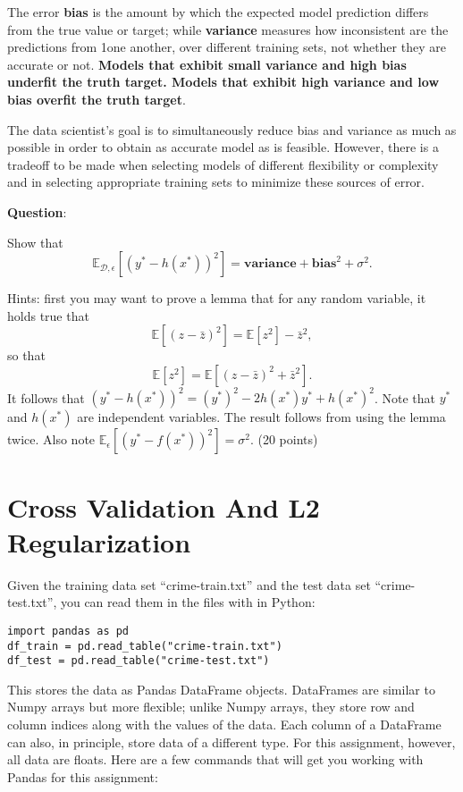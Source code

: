 \documentclass{article}
\begin{document}
The error \textbf{bias} is the amount by which the expected model prediction differs from the true value or target; while \textbf{variance} measures how inconsistent are the predictions from 1one another, over different training sets, not whether they are accurate or not. \textbf{Models that exhibit small variance and high bias underfit the truth target. Models that exhibit high variance and low bias overfit the truth target}.

The data scientist’s goal is to simultaneously reduce bias and variance as much as possible in order to obtain as accurate model as is feasible. However, there is a tradeoff to be made when selecting models of different flexibility or complexity and in selecting appropriate training sets to minimize these sources of error.

\textbf{Question}: 

Show that
$$
\mathbb{E}_{\mathcal{D},\epsilon}[(y^*-h(x^*))^2] = \textbf{variance}+\textbf{bias}^2+\sigma^2.
$$

Hints: first you may want to prove a lemma that for any random variable, it holds true that
$$
\mathbb{E}[(z-\bar z)^2] = \mathbb{E}[z^2]-\bar{z}^2,
$$
so that
$$
\mathbb{E}[z^2]=\mathbb{E}[(z-\bar z)^2+\bar{z}^2].
$$
It follows that $(y^*-h(x^*))^2 = (y^*)^2 - 2h(x^*)y^*+h(x^*)^2$. Note that $y^*$ and $h(x^*)$ are independent variables. The result follows from using the lemma twice. Also note $\mathbb{E}_{\epsilon}[(y^*-f(x^*))^2]=\sigma^2$.  (20 points)




\section{Cross Validation And L2 Regularization}
Given the training data set ``crime-train.txt''  and the test data set ``crime-test.txt'', you can read them in the files with in Python:
\begin{verbatim}
import pandas as pd
df_train = pd.read_table("crime-train.txt")
df_test = pd.read_table("crime-test.txt")
\end{verbatim}
This stores the data as Pandas DataFrame objects. DataFrames are similar to Numpy arrays but more flexible; unlike Numpy arrays, they store row and column indices along with the values of the data. Each column of a DataFrame can also, in principle, store data of a different type. For this assignment, however, all data are floats. Here are a few commands that will get you working with Pandas for this assignment:
\end{document}
